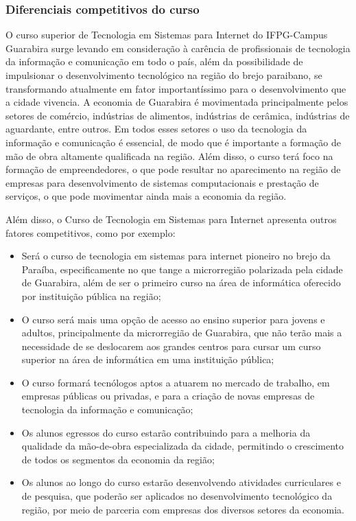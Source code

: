 \subsubsection{Diferenciais competitivos do curso}

 O curso superior de Tecnologia em Sistemas para Internet do IFPG-Campus Guarabira surge levando em consideração à carência de profissionais de tecnologia da informação e comunicação em todo o país, além da possibilidade de impulsionar o desenvolvimento tecnológico na região do brejo paraibano, se transformando atualmente em fator importantíssimo para o desenvolvimento que a cidade vivencia. A economia de Guarabira é movimentada principalmente pelos setores de comércio, indústrias de alimentos, indústrias de cerâmica, indústrias de aguardante, entre outros. Em todos esses setores o uso da tecnologia da informação e comunicação é essencial, de modo que é importante a formação de mão de obra altamente qualificada na região. Além disso, o curso terá foco na formação de empreendedores, o que pode resultar no aparecimento na região de empresas para desenvolvimento de sistemas computacionais e prestação de serviços, o que pode movimentar ainda mais a economia da região.
 
 Além disso, o Curso de Tecnologia em Sistemas para Internet apresenta outros fatores competitivos, como por exemplo: 

\begin{itemize}
	
\item Será o curso de tecnologia em sistemas para internet pioneiro no brejo da Paraíba, especificamente no que tange a microrregião polarizada pela cidade de Guarabira, além de ser o primeiro curso na área de informática oferecido por instituição pública na região;

\item O curso será mais uma opção de acesso ao ensino superior para jovens e adultos, principalmente da microrregião de Guarabira, que não terão mais a necessidade de se deslocarem aos grandes centros para cursar um curso superior na área de informática em uma instituição pública;

\item O curso formará tecnólogos aptos a atuarem no mercado de trabalho, em empresas públicas ou privadas, e para a criação de novas empresas de tecnologia da informação e comunicação; 

\item Os alunos egressos do curso estarão contribuindo para a melhoria da qualidade da mão-de-obra especializada da cidade, permitindo o crescimento de todos os segmentos da economia da região;

\item Os alunos ao longo do curso estarão desenvolvendo atividades curriculares e de pesquisa, que poderão ser aplicados no desenvolvimento tecnológico da região, por meio de parceria com empresas dos diversos setores da economia.

\end{itemize}



